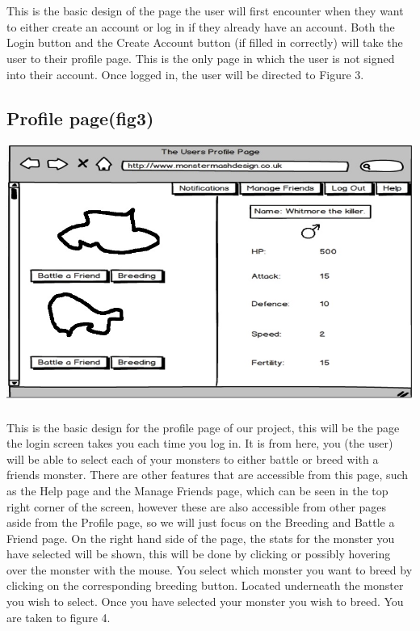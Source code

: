 \documentclass{project}
\begin{document}
\\
\\
This is the basic design of the page the user will first encounter when they want to
either create an account or log in if they already have an account. Both the Login
button and the Create Account button (if filled in correctly) will take the user to
their profile page. This is the only page in which the user is not signed into their
account.
Once logged in, the user will be directed to Figure 3.
\newpage


\subsection{Profile page(fig3)}
\includegraphics[scale=0.5]{userProfile.jpg}
\\
\\
This is the basic design for the profile page of our project, this will be the page
the login screen takes you each time you log in. It is from here, you (the user)
will be able to select each of your monsters to either battle or breed with a friends
monster. There are other features that are accessible from this page, such as the
Help page and the Manage Friends page, which can be seen in the top right corner of
the screen, however these are also accessible from other pages aside from the Profile
page, so we will just focus on the Breeding and Battle a Friend page.
On the right hand side of the page, the stats for the monster you have selected
will be shown, this will be done by clicking or possibly hovering over the monster
with the mouse.
You select which monster you want to breed by clicking on the corresponding
breeding button. Located underneath the monster you wish to select. Once you
have selected your monster you wish to breed. You are taken to figure 4.
\newpage
\end{document}
